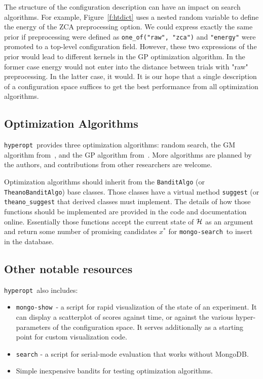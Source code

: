 \documentclass{article}
\newcommand{\hyperopt}{{\tt hyperopt}}
\newcommand{\mongosearch}{{\tt mongo-search}}
\newcommand{\mongoshow}{{\tt mongo-show}}
\begin{document}
The structure of the configuration description can have an impact on search algorithms.
For example, Figure~\ref{f:htdict} uses a nested random variable to define the energy of the ZCA preprocessing option.
We could express exactly the same prior if preprocessing were defined as
{\tt one\_of("raw", "zca")} and {\tt "energy"} were promoted to a top-level configuration field.
However, these two expressions of the prior would lead to different kernels in the GP optimization algorithm.
In the former case energy would not enter into the distance between trials with "raw" preprocessing.
In the latter case, it would.
It is our hope that a single description of a configuration space suffices to get the best performance from all optimization algorithms.


\subsection{Optimization Algorithms}

\hyperopt\ provides three optimization algorithms:
random search,
the GM algorithm from~\cite{nipspaper},
and the GP algorithm from~\cite{nipspaper}.
More algorithms are planned by the authors,
and contributions from other researchers are welcome.

Optimization algorithms should inherit from the {\tt BanditAlgo} (or {\tt TheanoBanditAlgo}) base classes.
Those classes have a virtual method {\tt suggest} (or {\tt theano\_suggest} that derived classes must implement.
The details of how those functions should be implemented are provided in the code and documentation online.
Essentially those functions accept the current state of ${\cal H}$ as an argument
and return some number of promising candidates
$x^*$ for \mongosearch\ to insert in the database.

\subsection{Other notable resources}

\hyperopt\ also includes:
\begin{itemize}
\item \mongoshow\ - a script for rapid visualization of the state of an experiment.
It can display a scatterplot of scores against time,
or against the various hyper-parameters of the configuration space.
It serves additionally as a starting point for custom visualization code.
\item {\tt search} - a script for serial-mode evaluation that works without MongoDB.
\item Simple inexpensive bandits for testing optimization algorithms.
\end{itemize}
\end{document}
